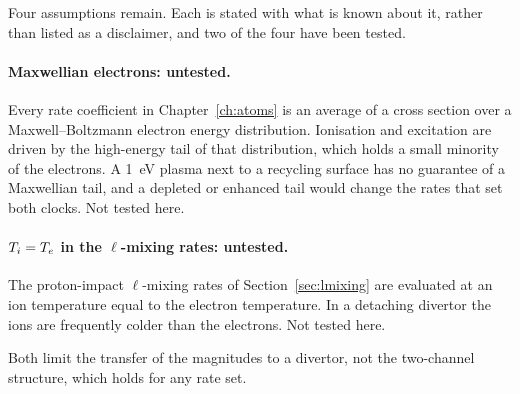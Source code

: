 Four assumptions remain. Each is stated with what is known about it, rather than
listed as a disclaimer, and two of the four have been tested.

\paragraph{Maxwellian electrons: untested.} Every rate coefficient in
Chapter~\ref{ch:atoms} is an average of a cross section over a Maxwell--Boltzmann
electron energy distribution. Ionisation and excitation are driven by the
high-energy tail of that distribution, which holds a small minority of the
electrons. A \SI{1}{\electronvolt} plasma next to a recycling surface has no
guarantee of a Maxwellian tail, and a depleted or enhanced tail would change the
rates that set both clocks. Not tested here.

\paragraph{$T_i = T_e$ in the $\ell$-mixing rates: untested.} The
proton-impact $\ell$-mixing rates of Section~\ref{sec:lmixing} are evaluated at
an ion temperature equal to the electron temperature. In a detaching divertor
the ions are frequently colder than the electrons. Not tested here.

Both limit the transfer of the magnitudes to a divertor, not the two-channel
structure, which holds for any rate set.


